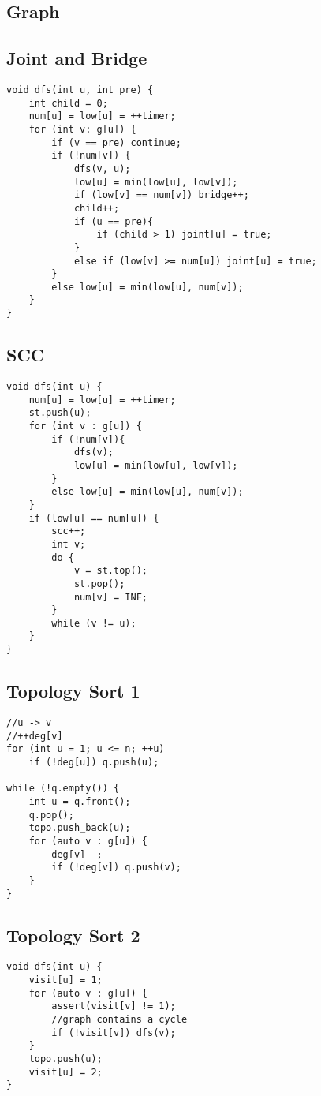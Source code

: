 \documentclass[11pt,a4paper]{article}
\begin{document}
\begin{multicols*}{2}
\section{Graph}
\subsection{Joint and Bridge}
\begin{lstlisting}
void dfs(int u, int pre) {
    int child = 0; 
    num[u] = low[u] = ++timer;
    for (int v: g[u]) {
        if (v == pre) continue;
        if (!num[v]) {
            dfs(v, u);
            low[u] = min(low[u], low[v]);
            if (low[v] == num[v]) bridge++;
            child++;
            if (u == pre){
                if (child > 1) joint[u] = true;
            }
            else if (low[v] >= num[u]) joint[u] = true;
        }
        else low[u] = min(low[u], num[v]);
    }
}
\end{lstlisting}

\subsection{SCC}
\begin{lstlisting}
void dfs(int u) {
    num[u] = low[u] = ++timer;
    st.push(u);
    for (int v : g[u]) {
        if (!num[v]){
            dfs(v);
            low[u] = min(low[u], low[v]);
        }
        else low[u] = min(low[u], num[v]);
    }
    if (low[u] == num[u]) {
        scc++;
        int v;
        do {
            v = st.top();
            st.pop();
            num[v] = INF;
        }
        while (v != u);
    }
}
\end{lstlisting}

\subsection{Topology Sort 1}
\begin{lstlisting}
//u -> v
//++deg[v]
for (int u = 1; u <= n; ++u)
    if (!deg[u]) q.push(u);

while (!q.empty()) {
    int u = q.front();
    q.pop();
    topo.push_back(u);
    for (auto v : g[u]) {
        deg[v]--;
        if (!deg[v]) q.push(v);
    }
}
\end{lstlisting}

\subsection{Topology Sort 2}
\begin{lstlisting}
void dfs(int u) {
    visit[u] = 1;
    for (auto v : g[u]) {
        assert(visit[v] != 1); 
        //graph contains a cycle
        if (!visit[v]) dfs(v);
    }
    topo.push(u);
    visit[u] = 2;
}
\end{lstlisting}


\end{multicols*}
\end{document}
